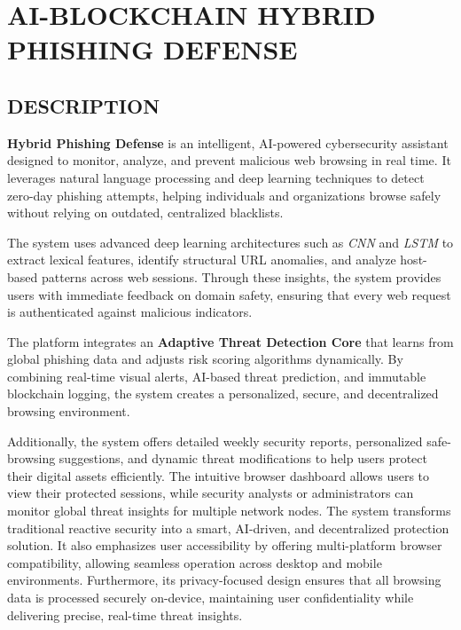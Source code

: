 \newpage
\chapter{AI-BLOCKCHAIN HYBRID PHISHING DEFENSE}

\section{DESCRIPTION}

\hspace{1cm}\textbf{Hybrid Phishing Defense} is an intelligent, AI-powered cybersecurity assistant designed to monitor, analyze, and prevent malicious web browsing in real time. It leverages natural language processing and deep learning techniques to detect zero-day phishing attempts, helping individuals and organizations browse safely without relying on outdated, centralized blacklists. 

The system uses advanced deep learning architectures such as \textit{CNN} and \textit{LSTM} to extract lexical features, identify structural URL anomalies, and analyze host-based patterns across web sessions. Through these insights, the system provides users with immediate feedback on domain safety, ensuring that every web request is authenticated against malicious indicators. 

The platform integrates an \textbf{Adaptive Threat Detection Core} that learns from global phishing data and adjusts risk scoring algorithms dynamically. By combining real-time visual alerts, AI-based threat prediction, and immutable blockchain logging, the system creates a personalized, secure, and decentralized browsing environment. 

Additionally, the system offers detailed weekly security reports, personalized safe-browsing suggestions, and dynamic threat modifications to help users protect their digital assets efficiently. The intuitive browser dashboard allows users to view their protected sessions, while security analysts or administrators can monitor global threat insights for multiple network nodes. The system transforms traditional reactive security into a smart, AI-driven, and decentralized protection solution. It also emphasizes user accessibility by offering multi-platform browser compatibility, allowing seamless operation across desktop and mobile environments. Furthermore, its privacy-focused design ensures that all browsing data is processed securely on-device, maintaining user confidentiality while delivering precise, real-time threat insights.

